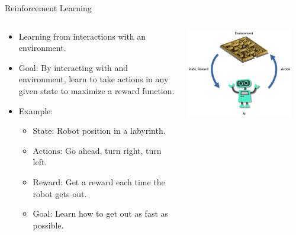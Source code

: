 \begin{frame}{Reinforcement Learning}
  \begin{columns}
    \begin{column}{0.6\textwidth}
  \begin{itemize}
    \item Learning from interactions with an environment.
    \item Goal: By interacting with and environment, learn to take actions in any given state to maximize a reward function.
    \item Example:
      \begin{itemize}
        \item State: Robot position in a labyrinth.
        \item Actions: Go ahead, turn right, turn left.
        \item Reward: Get a reward each time the robot gets out.
        \item Goal: Learn how to get out as fast as possible.
      \end{itemize}
  \end{itemize}
\end{column}
\begin{column}{0.4\textwidth}

  \begin{center}
    \includegraphics[width=0.9\textwidth]{images/RL.png}
  \end{center}

\end{column}
\end{columns}
\end{frame}

